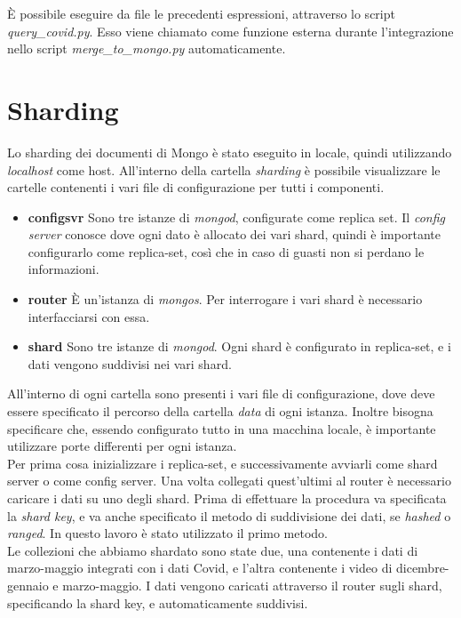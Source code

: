 \documentclass[10pt, a4paper,openany]{article}
\begin{document}
\`E possibile eseguire da file le precedenti espressioni, attraverso lo script \textit{query\_covid.py}. Esso viene chiamato come funzione esterna durante l'integrazione nello script \textit{merge\_to\_mongo.py} automaticamente.

\section*{Sharding}

Lo sharding dei documenti di Mongo è stato eseguito in locale, quindi utilizzando \textit{localhost} come host. All'interno della cartella \textit{sharding} è possibile visualizzare le cartelle contenenti i vari file di configurazione per tutti i componenti.

\begin{itemize}
	\item \textbf{configsvr} Sono tre istanze di \textit{mongod}, configurate come replica set. Il \textit{config server} conosce dove ogni dato è allocato dei vari shard, quindi è importante configurarlo come replica-set, così che in caso di guasti non si perdano le informazioni.
	\item \textbf{router} \`E un'istanza di \textit{mongos}. Per interrogare i vari shard è necessario interfacciarsi con essa.
	\item \textbf{shard} Sono tre istanze di \textit{mongod}. Ogni shard è configurato in replica-set, e i dati vengono suddivisi nei vari shard.
\end{itemize}

All'interno di ogni cartella sono presenti i vari file di configurazione, dove deve essere specificato il percorso della cartella \textit{data} di ogni istanza. Inoltre bisogna specificare che, essendo configurato tutto in una macchina locale, è importante utilizzare porte differenti per ogni istanza.
\\
Per prima cosa inizializzare i replica-set, e successivamente avviarli come shard server o come config server. Una volta collegati quest'ultimi al router è necessario caricare i dati su uno degli shard. Prima di effettuare la procedura va specificata la \textit{shard key}, e va anche specificato il metodo di suddivisione dei dati, se \textit{hashed} o \textit{ranged}. In questo lavoro è stato utilizzato il primo metodo.
\\
Le collezioni che abbiamo shardato sono state due, una contenente i dati di marzo-maggio integrati con i dati Covid, e l'altra contenente i video di dicembre-gennaio e marzo-maggio. I dati vengono caricati attraverso il router sugli shard, specificando la shard key, e automaticamente suddivisi.
\end{document}
